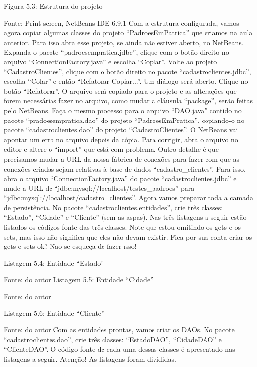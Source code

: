 Figura 5.3: Estrutura do projeto
 
Fonte: Print screen, NetBeans IDE 6.9.1
Com a estrutura configurada, vamos agora copiar algumas classes do projeto “PadroesEmPatrica” que criamos na aula anterior. Para isso abra esse projeto, se ainda não estiver aberto, no NetBeans. Expanda o pacote “padroesempratica.jdbc”, clique com o botão direito no arquivo “ConnectionFactory.java” e escolha “Copiar”. Volte ao projeto “CadastroClientes”, clique com o botão direito no pacote “cadastroclientes.jdbc”, escolha “Colar” e então “Refatorar Copiar...”. Um diálogo será aberto. Clique no botão “Refatorar”. O arquivo será copiado para o projeto e as alterações que forem necessárias fazer no arquivo, como mudar a cláusula “package”, serão feitas pelo NetBeans. Faça o mesmo processo para o arquivo “DAO.java” contido no pacote “pradoesempratica.dao” do projeto “PadroesEmPratica”, copiando-o no pacote “cadastroclientes.dao” do projeto “CadastroClientes”. O NetBeans vai apontar um erro no arquivo depois da cópia. Para corrigir, abra o arquivo no editor e altere o “import” que está com problema. 
Outro detalhe é que precisamos mudar a URL da nossa fábrica de conexões para fazer com que as conexões criadas sejam relativas à base de dados “cadastro\_clientes”. Para isso, abra o arquivo “ConnectionFactory.java” do pacote “cadastroclientes.jdbc” e mude a URL de “jdbc:mysql://localhost/testes\_padroes” para “jdbc:mysql://localhost/cadastro\_clientes”.
Agora vamos preparar toda a camada de persistência. No pacote “cadastroclientes.entidades”, crie três classes: “Estado”, “Cidade” e “Cliente” (sem as aspas). Nas três listagens a seguir estão listados os códigos-fonte das três classes. Note que estou omitindo os gets e os sets, mas isso não significa que eles não devam existir. Fica por sua conta criar os gets e sets ok? Não se esqueça de fazer isso!

Listagem 5.4: Entidade “Estado”
 
Fonte: do autor
Listagem 5.5: Entidade “Cidade”
 
Fonte: do autor








Listagem 5.6: Entidade “Cliente”
 
Fonte: do autor
Com as entidades prontas, vamos criar os DAOs. No pacote “cadastroclientes.dao”, crie três classes: “EstadoDAO”, “CidadeDAO” e “ClienteDAO”. O código-fonte de cada uma dessas classes é apresentado nas listagens a seguir. Atenção! As listagens foram divididas.











